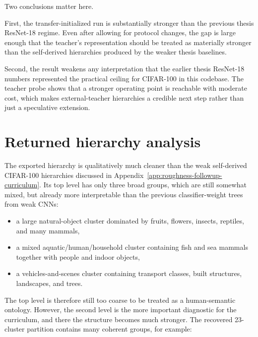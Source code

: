 Two conclusions matter here.

First, the transfer-initialized run is substantially stronger than the previous
thesis ResNet-18 regime. Even after allowing for protocol changes, the gap is
large enough that the teacher's representation should be treated as materially
stronger than the self-derived hierarchies produced by the weaker thesis
baselines.

Second, the result weakens any interpretation that the earlier thesis ResNet-18
numbers represented the practical ceiling for CIFAR-100 in this codebase. The
teacher probe shows that a stronger operating point is reachable with moderate
cost, which makes external-teacher hierarchies a credible next step rather than
just a speculative extension.

\section{Returned hierarchy analysis}

The exported hierarchy is qualitatively much cleaner than the weak self-derived
CIFAR-100 hierarchies discussed in Appendix~\ref{app:roughness-followup-curriculum}.
Its top level has only three broad groups, which are still somewhat mixed, but
already more interpretable than the previous classifier-weight trees from weak
CNNs:

\begin{itemize}
    \item a large natural-object cluster dominated by fruits, flowers, insects,
          reptiles, and many mammals,
    \item a mixed aquatic/human/household cluster containing fish and sea
          mammals together with people and indoor objects,
    \item a vehicles-and-scenes cluster containing transport classes, built
          structures, landscapes, and trees.
\end{itemize}

The top level is therefore still too coarse to be treated as a human-semantic
ontology. However, the second level is the more important diagnostic for the
curriculum, and there the structure becomes much stronger. The recovered
23-cluster partition contains many coherent groups, for example:

